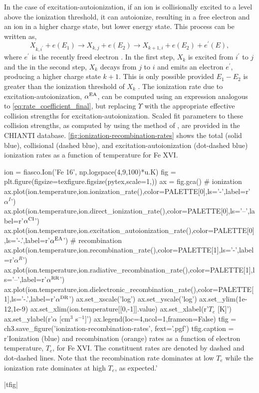 In the case of excitation-autoionization, if an ion is collisionally excited to a level above the ionization threshold, it can autoionize, resulting in a free electron and an ion in a higher charge state, but lower energy state. This process can be written as,
\begin{equation}\label{eq:excitation_autoionization}
    X_{k,i^\prime} + e(E_1) \to X_{k,j} + e(E_2) \to X_{k+1,i} + e(E_2) + e^\prime(E),
\end{equation}
where $e^\prime$ is the recently freed electron \citep{phillips_ultraviolet_2008}. In the first step, $X_k$ is excited from $i^\prime$ to $j$ and the in the second step, $X_k$ decays from $j$ to $i$ and emits an electron $e^\prime$, producing a higher charge state $k+1$. This is only possible provided $E_1 - E_2$ is greater than the ionization threshold of $X_k$ \citep{bradshaw_collisional_2013}. The ionization rate due to excitation-autoionization, $\alpha^\textup{EA}$, can be computed using an expression analogous to \autoref{eq:rate_coefficient_final}, but replacing $\Upsilon$ with the appropriate effective collision strengths for excitation-autoionization. Scaled fit parameters to these collision strengths, as computed by \citet{dere_ionization_2007} using the method of \citet{burgess_analysis_1992}, are provided in the CHIANTI database. \autoref{fig:ionization-recombination-rates} shows the total (solid blue), collisional (dashed blue), and excitation-autoionization (dot-dashed blue) ionization rates as a function of temperature for Fe XVI.   

\begin{pycode}[chapter3]
ion = fiasco.Ion('Fe 16', np.logspace(4,9,100)*u.K)
fig = plt.figure(figsize=texfigure.figsize(pytex,scale=1,))
ax = fig.gca()
# ionization
ax.plot(ion.temperature,ion.ionization_rate(),color=PALETTE[0],ls='-',label=r'$\alpha^I$')
ax.plot(ion.temperature,ion.direct_ionization_rate(),color=PALETTE[0],ls='--',label=r'$\alpha^\textup{CI}$')
ax.plot(ion.temperature,ion.excitation_autoionization_rate(),color=PALETTE[0],ls='-.',label=r'$\alpha^\textup{EA}$')
# recombination
ax.plot(ion.temperature,ion.recombination_rate(),color=PALETTE[1],ls='-',label=r'$\alpha^R$')
ax.plot(ion.temperature,ion.radiative_recombination_rate(),color=PALETTE[1],ls='--',label=r'$\alpha^\textup{RR}$')
ax.plot(ion.temperature,ion.dielectronic_recombination_rate(),color=PALETTE[1],ls='-.',label=r'$\alpha^\textup{DR}$')
ax.set_xscale('log')
ax.set_yscale('log')
ax.set_ylim(1e-12,1e-9)
ax.set_xlim(ion.temperature[[0,-1]].value)
ax.set_xlabel(r'$T_e$ [K]')
ax.set_ylabel(r'$\alpha$ [cm$^3$ s$^{-1}$]')
ax.legend(loc=4,ncol=1,frameon=False)
tfig = ch3.save_figure('ionization-recombination-rates', fext='.pgf')
tfig.caption = r'Ionization (blue) and recombination (orange) rates as a function of electron temperature, $T_e$, for Fe XVI. The constituent rates are denoted by dashed and dot-dashed lines. Note that the recombination rate dominates at low $T_e$ while the ionization rate dominates at high $T_e$, as expected.'
\end{pycode}
\py[chapter3]|tfig|

